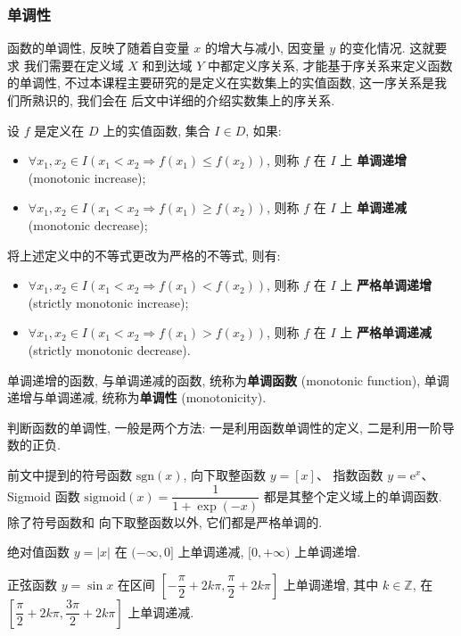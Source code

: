 \documentclass[10pt,UTF8]{book} %
\begin{document}
\subsubsection{单调性}

函数的单调性, 反映了随着自变量 $x$ 的增大与减小, 因变量 $y$ 的变化情况. 这就要求
我们需要在定义域 $X$ 和到达域 $Y$ 中都定义序关系, 才能基于序关系来定义函数的单调性,
不过本课程主要研究的是定义在实数集上的实值函数, 这一序关系是我们所熟识的, 我们会在
后文中详细的介绍实数集上的序关系.

\begin{definition}[函数的单调性]
    设 $f$ 是定义在 $D$ 上的实值函数, 集合 $I \in D$, 如果:
    \begin{itemize}[itemsep=0pt]
        \item $\forall x_1,x_2 \in I \left(
            x_1 < x_2 \Longrightarrow f(x_1) \leqslant f(x_2)
        \right)$, 则称 $f$ 在 $I$ 上
        \textbf{单调递增} (monotonic increase);
        \item $\forall x_1,x_2 \in I \left(
            x_1 < x_2 \Longrightarrow f(x_1) \geqslant f(x_2)
        \right)$, 则称 $f$ 在 $I$ 上
        \textbf{单调递减} (monotonic decrease);
    \end{itemize}
    将上述定义中的不等式更改为严格的不等式, 则有:
    \begin{itemize}[itemsep=0pt]
        \item $\forall x_1,x_2 \in I \left(
            x_1 < x_2 \Longrightarrow f(x_1) < f(x_2)
        \right)$, 则称 $f$ 在 $I$ 上
        \textbf{严格单调递增} (strictly monotonic increase);
        \item $\forall x_1,x_2 \in I \left(
            x_1 < x_2 \Longrightarrow f(x_1) > f(x_2)
        \right)$, 则称 $f$ 在 $I$ 上
        \textbf{严格单调递减} (strictly monotonic decrease).
    \end{itemize}
    单调递增的函数, 与单调递减的函数, 统称为\textbf{单调函数} (monotonic function),
    单调递增与单调递减, 统称为\textbf{单调性} (monotonicity).
\end{definition}
\begin{remark}
    判断函数的单调性, 一般是两个方法: 一是利用函数单调性的定义, 二是利用一阶导数的正负.
\end{remark}
\begin{example}
    前文中提到的符号函数 $\mathrm{sgn}(x)$, 向下取整函数 $y = [x]$、
    指数函数 $y = \mathrm{e}^x$、Sigmoid 函数 $\mathrm{sigmoid}(x)
    = \dfrac{1}{1+\exp(-x)}$ 都是其整个定义域上的单调函数. 除了符号函数和
    向下取整函数以外, 它们都是严格单调的.
\end{example}
\begin{example}
    绝对值函数 $y = |x|$ 在 $(-\infty,0]$ 上单调递减, $[0,+\infty)$ 上单调递增.
\end{example}
\begin{example}
    正弦函数 $y = \sin x$ 在区间 
    $\left[ -\dfrac{\pi}{2} + 2k\pi, \dfrac{\pi}{2} + 2k\pi \right]$ 
    上单调递增, 其中 $k \in \mathbb{Z}$, 在
    $\left[ \dfrac{\pi}{2} + 2k\pi, \dfrac{3\pi}{2} + 2k\pi \right]$
    上单调递减.
\end{example}
\end{document}
